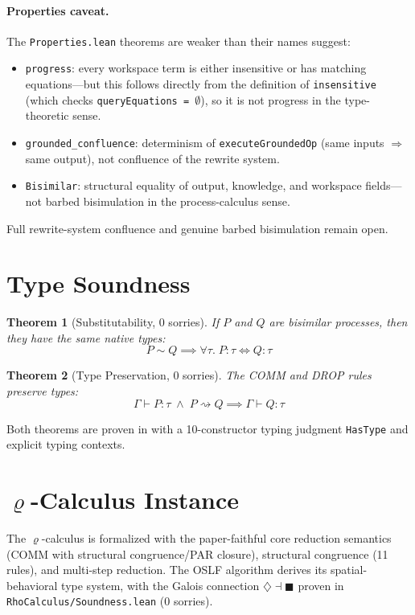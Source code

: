 \documentclass[]{article}
\newtheorem{theorem}{Theorem}
\newcommand{\code}[1]{\texttt{#1}}
\newcommand{\codepath}[1]{\path{#1}}
\newcommand{\rhocalc}{\ensuremath{\varrho}}
\newcommand{\Dia}{\ensuremath{\diamondsuit}}
\newcommand{\Bx}{\ensuremath{\blacksquare}}
\begin{document}
\paragraph{Properties caveat.}
The \code{Properties.lean} theorems are weaker than their names suggest:
\begin{itemize}
\item \code{progress}: every workspace term is either insensitive or has
  matching equations---but this follows directly from the definition of
  \code{insensitive} (which checks \code{queryEquations = $\emptyset$}),
  so it is not progress in the type-theoretic sense.
\item \code{grounded\_confluence}: determinism of \code{executeGroundedOp}
  (same inputs $\Rightarrow$ same output), not confluence of the rewrite
  system.
\item \code{Bisimilar}: structural equality of output, knowledge, and
  workspace fields---not barbed bisimulation in the process-calculus sense.
\end{itemize}
Full rewrite-system confluence and genuine barbed bisimulation remain open.

\section{Type Soundness}

\begin{theorem}[Substitutability, 0 sorries]
If $P$ and $Q$ are bisimilar processes, then they have the same native types:
$$P \sim Q \implies \forall \tau.\; P : \tau \iff Q : \tau$$
\end{theorem}

\begin{theorem}[Type Preservation, 0 sorries]
The COMM and DROP rules preserve types:
$$\Gamma \vdash P : \tau \;\wedge\; P \rightsquigarrow Q \implies \Gamma \vdash Q : \tau$$
\end{theorem}

Both theorems are proven in \codepath{RhoCalculus/Soundness.lean} with
a 10-constructor typing judgment \code{HasType} and explicit typing contexts.

\section{\rhocalc{}-Calculus Instance}

The \rhocalc{}-calculus is formalized with the paper-faithful core reduction semantics (COMM with structural congruence/PAR closure),
structural congruence (11 rules), and multi-step reduction. The OSLF algorithm
derives its spatial-behavioral type system, with the Galois connection
$\Dia \dashv \Bx$ proven in \code{RhoCalculus/Soundness.lean} (0 sorries).
\end{document}
